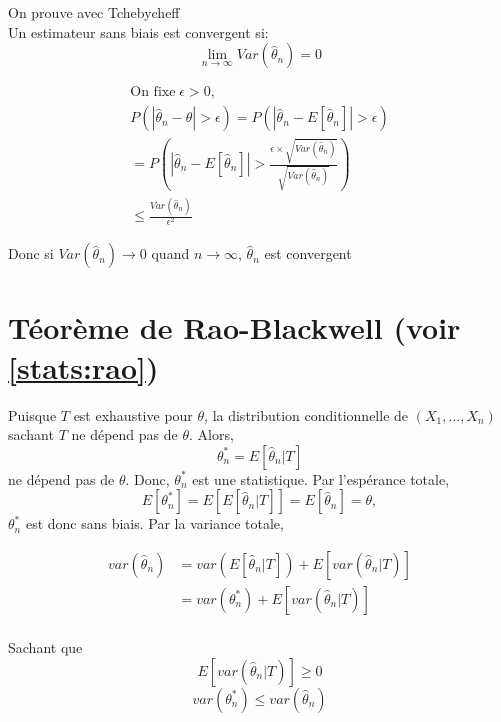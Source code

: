 \label{preuves:convergence} 

On prouve avec Tchebycheff\\
Un estimateur sans biais est convergent si: \[
\lim_{n\to \infty} Var(\hat{\theta}_n) =0
\]

\begin{gather*}
\text{On fixe}\; \epsilon>0,\\
P(|\hat{\theta}_n-\theta|>\epsilon)= P(|\hat{\theta}_n-E[\hat{\theta}_n]|>\epsilon)\\
=P(|\hat{\theta}_n-E[\hat{\theta}_n]|>\frac{\epsilon\times \sqrt{Var(\hat{\theta}_n)}}{\sqrt{Var(\hat{\theta}_n)}})\\
\le \frac{Var(\hat{\theta}_n)}{\epsilon^2}
\end{gather*}

Donc si \(Var(\hat{\theta}_n)\to 0\) quand \(n \to \infty\),
\(\hat{\theta}_n\) est convergent



\section{Téorème de Rao-Blackwell (voir \autoref{stats:rao})}\label{teoreme-de-rao-blackwell-voir}

\label{preuves:rao} Puisque \(T\) est exhaustive pour \(\theta\), la
distribution conditionnelle de \((X_1,\dots,X_n)\) sachant \(T\) ne
dépend pas de \(\theta\). Alors, \[
\theta^{*}_n=E[\hat{\theta}_n|T]
\] ne dépend pas de \(\theta\). Donc, \(\theta^{*}_n\) est une
statistique. Par l'espérance totale, \[
E[\theta^{*}_n]=E[E[\hat{\theta}_n|T]]=E[\hat{\theta}_n]=\theta,
\] \(\theta^{*}_n\) est donc sans biais. Par la variance totale,

\begin{align*}
var(\hat{\theta}_n) &=var(E[\hat{\theta}_n|T])+E[var(\hat{\theta}_n|T)] \\
&= var(\theta^{*}_n)+E[var(\hat{\theta}_n|T)]\\
\end{align*}

Sachant que \[
E[var(\hat{\theta}_n|T)] \ge 0 
\] \[
var(\theta^{*}_n)\le var(\hat{\theta}_n)
\]

